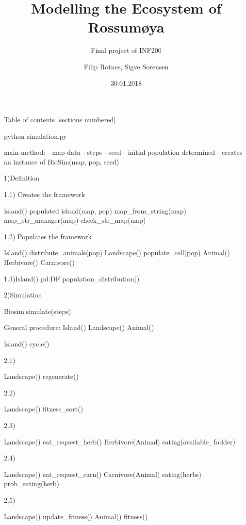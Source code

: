 \documentclass[aspectratio=169]{beamer}
\title{Modelling the Ecosystem of Rossumøya}
\subtitle{Final project of INF200}
\date{30.01.2018}
\author{Filip Rotnes, Sigve Sorensen}
\institute{Norwegian University of Life Sciences}
\begin{document}
\maketitle

\begin{frame}{Table of contents}
  [sections numbered]
  \tableofcontents[hideallsubsections]
\end{frame}

\begin{frame}

python simulation.py

main-method:
- map data
- steps
- seed
- initial population determined
- creates an instance of BioSim(map, pop, seed)

1)Definition

1.1) Creates the framework

Island()
\rightarrow populated island(map, pop)
	\rightarrow map_from_string(map)
		\rightarrow map_str_manager(map)
			\rightarrow check_str_map(map)
			
1.2) Populates the framework

Island()
\rightarrow distribute_animals(pop)
	Landscape()
	\rightarrow populate_cell(pop)
		Animal()
			\rightarrow Herbivore()
			\rightarrow Carnivore()
	
1.3)Island()		
	pd.DF \leftarrow population_distribution()
	

2)Simulation

Biosim.simulate(steps)

General procedure:
Island() \rightarrow Landscape() \rightarrow Animal()

Island()
	\rightarrow cycle()
	
2.1)

Landscape()
	\rightarrow regenerate()
	
2.2) 

Landscape()
	\rightarrow fitness_sort()
	
2.3)

Landscape()
	\rightarrow eat_request_herb()
		Herbivore(Animal)
		\rightarrow eating(available_fodder)
		
2.4)

Landscape()
	\rightarrow eat_request_carn()
		Carnivore(Animal)
		\rightarrow eating(herbs)
			\rightarrow prob_eating(herb)
			
2.5)

Landscape()
	\rightarrow update_fitness()
		Animal()
		\rightarrow fitness()
		

\end{frame}
\end{document}

